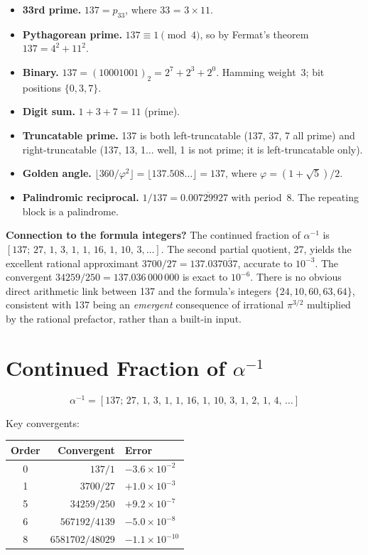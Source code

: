 \documentclass[11pt]{article}
\begin{document}
\begin{itemize}
\item \textbf{33rd prime.}  $137 = p_{33}$, where 33 = $3\times 11$.
\item \textbf{Pythagorean prime.}  $137 \equiv 1\pmod{4}$, so by Fermat's theorem
      $137 = 4^2 + 11^2$.
\item \textbf{Binary.}  $137 = (10001001)_2 = 2^7 + 2^3 + 2^0$.
      Hamming weight~3; bit positions $\{0,3,7\}$.
\item \textbf{Digit sum.}  $1+3+7 = 11$ (prime).
\item \textbf{Truncatable prime.}  137 is both left-truncatable (137, 37, 7 all prime)
      and right-truncatable (137, 13, 1$\ldots$ well, 1 is not prime; it is
      left-truncatable only).
\item \textbf{Golden angle.}  $\lfloor 360/\varphi^2\rfloor = \lfloor 137.508\ldots\rfloor = 137$,
      where $\varphi = (1+\sqrt{5})/2$.
\item \textbf{Palindromic reciprocal.}  $1/137 = 0.\overline{00729927}$ with
      period~8.  The repeating block is a palindrome.
\end{itemize}

\noindent
\textbf{Connection to the formula integers?}
The continued fraction of $\alpha^{-1}$ is $[137;\,27,\,1,\,3,\,1,\,1,\,16,\,1,\,10,\,3,\ldots]$.
The second partial quotient, 27, yields the excellent rational approximant
$3700/27 = 137.037\overline{037}$, accurate to $10^{-3}$.
The convergent $34259/250 = 137.036\,000\,000$ is exact to $10^{-6}$.
There is no obvious direct arithmetic link between 137 and the formula's
integers $\{24,10,60,63,64\}$, consistent with 137 being an \emph{emergent}
consequence of irrational $\pi^{3/2}$ multiplied by the rational prefactor,
rather than a built-in input.

\section{Continued Fraction of $\alpha^{-1}$}
\label{sec:cf}

\begin{equation}
\alpha^{-1} = [137;\,27,\,1,\,3,\,1,\,1,\,16,\,1,\,10,\,3,\,1,\,2,\,1,\,4,\,\ldots]
\end{equation}

\noindent
Key convergents:
\begin{center}
\begin{tabular}{crl}
\toprule
\textbf{Order} & \textbf{Convergent} & \textbf{Error} \\
\midrule
0 & $137/1$          & $-3.6\times 10^{-2}$ \\
1 & $3700/27$        & $+1.0\times 10^{-3}$ \\
5 & $34259/250$      & $+9.2\times 10^{-7}$ \\
6 & $567192/4139$    & $-5.0\times 10^{-8}$ \\
8 & $6581702/48029$  & $-1.1\times 10^{-10}$ \\
\bottomrule
\end{tabular}
\end{center}
\end{document}
